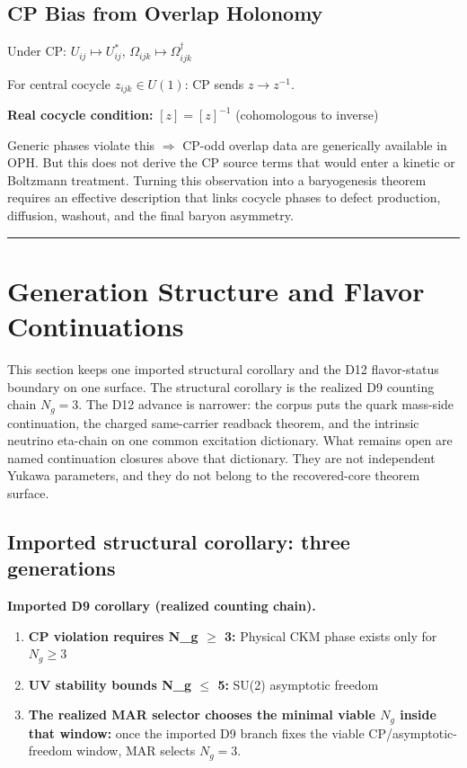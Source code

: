 \subsection{CP Bias from Overlap Holonomy}\label{114-cp-bias-from-overlap-holonomy}

Under CP: \(U_{ij} \mapsto U_{ij}^*\), \(\Omega_{ijk} \mapsto \Omega_{ijk}^\dagger\)

For central cocycle \(z_{ijk} \in U(1)\): CP sends \(z \to z^{-1}\).

\textbf{Real cocycle condition:} \([z] = [z]^{-1}\) (cohomologous to inverse)

Generic phases violate this \(\Rightarrow\) CP-odd overlap data are generically available in OPH. But this does not derive the CP source terms that would enter a kinetic or Boltzmann treatment. Turning this observation into a baryogenesis theorem requires an effective description that links cocycle phases to defect production, diffusion, washout, and the final baryon asymmetry.

\begin{center}\rule{0.5\linewidth}{0.5pt}\end{center}

\section{Generation Structure and Flavor Continuations}\label{12-generation-structure-and-yukawa-hierarchy}

This section keeps one imported structural corollary and the D12 flavor-status boundary on one surface. The structural corollary is the realized D9 counting chain \(N_g=3\). The D12 advance is narrower: the corpus puts the quark mass-side continuation, the charged same-carrier readback theorem, and the intrinsic neutrino eta-chain on one common excitation dictionary. What remains open are named continuation closures above that dictionary. They are not independent Yukawa parameters, and they do not belong to the recovered-core theorem surface.

\subsection{Imported structural corollary: three generations}\label{121-why-three-generations}

\textbf{Imported D9 corollary (realized counting chain).}

\begin{enumerate}
\def\labelenumi{\arabic{enumi}.}
\tightlist
\item
 \textbf{CP violation requires N\_g \ensuremath{\geq} 3:} Physical CKM phase exists only for \(N_g \geq 3\)
\item
 \textbf{UV stability bounds N\_g \ensuremath{\leq} 5:} SU(2) asymptotic freedom
\item
 \textbf{The realized MAR selector chooses the minimal viable \(N_g\) inside that window:} once the imported D9 branch fixes the viable CP/asymptotic-freedom window, MAR selects \(N_g=3\).
\end{enumerate}

